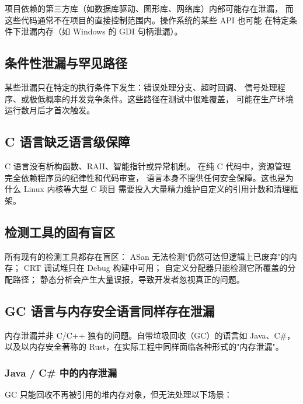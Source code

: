 \documentclass[12pt,a4paper,fontset=fandol]{ctexbook}
\begin{document}
项目依赖的第三方库（如数据库驱动、图形库、网络库）内部可能存在泄漏，
而这些代码通常不在项目的直接控制范围内。操作系统的某些 API 也可能
在特定条件下泄漏内存（如 Windows 的 GDI 句柄泄漏）。

\subsection{条件性泄漏与罕见路径}

某些泄漏只在特定的执行条件下发生：错误处理分支、超时回调、
信号处理程序、或极低概率的并发竞争条件。这些路径在测试中很难覆盖，
可能在生产环境运行数月后才首次触发。

\subsection{C 语言缺乏语言级保障}

C 语言没有析构函数、RAII、智能指针或异常机制。
在纯 C 代码中，资源管理完全依赖程序员的纪律性和代码审查，
语言本身不提供任何安全保障。这也是为什么 Linux 内核等大型 C 项目
需要投入大量精力维护自定义的引用计数和清理框架。

\subsection{检测工具的固有盲区}

\begin{guideline}[title={工具局限}]
所有现有的检测工具都存在盲区：
ASan 无法检测"仍然可达但逻辑上已废弃"的内存；
CRT 调试堆只在 Debug 构建中可用；
自定义分配器只能检测它所覆盖的分配路径；
静态分析会产生大量误报，导致开发者忽视真正的问题。
\end{guideline}

\subsection{GC 语言与内存安全语言同样存在泄漏}

内存泄漏并非 C/C++ 独有的问题。自带垃圾回收（GC）的语言如 Java、C\#，
以及以内存安全著称的 Rust，在实际工程中同样面临各种形式的"内存泄漏"。

\subsubsection*{Java / C\# 中的内存泄漏}

GC 只能回收不再被引用的堆内存对象，但无法处理以下场景：
\end{document}

